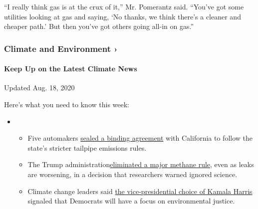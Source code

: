 ``I really think gas is at the crux of it,'' Mr. Pomerantz said.
``You've got some utilities looking at gas and saying, `No thanks, we
think there's a cleaner and cheaper path.' But then you've got others
going all-in on gas.''

\href{https://www.nytimes3xbfgragh.onion/section/climate?action=click\&pgtype=Article\&state=default\&region=MAIN_CONTENT_1\&context=storylines_keepup}{}

\hypertarget{climate-and-environment-}{%
\subsubsection{Climate and Environment
›}\label{climate-and-environment-}}

\hypertarget{keep-up-on-the-latest-climate-news}{%
\paragraph{Keep Up on the Latest Climate
News}\label{keep-up-on-the-latest-climate-news}}

Updated Aug. 18, 2020

Here's what you need to know this week:

\begin{itemize}
\item
  \begin{itemize}
  \tightlist
  \item
    Five automakers
    \href{https://www.nytimes3xbfgragh.onion/2020/08/17/climate/california-automakers-pollution.html?action=click\&pgtype=Article\&state=default\&region=MAIN_CONTENT_1\&context=storylines_keepup}{sealed
    a binding agreement} with California to follow the state's stricter
    tailpipe emissions rules.
  \item
    The Trump
    administration\href{https://www.nytimes3xbfgragh.onion/2020/08/13/climate/trump-methane.html?action=click\&pgtype=Article\&state=default\&region=MAIN_CONTENT_1\&context=storylines_keepup}{eliminated
    a major methane rule}, even as leaks are worsening, in a decision
    that researchers warned ignored science.
  \item
    Climate change leaders said
    \href{https://www.nytimes3xbfgragh.onion/2020/08/12/climate/kamala-harris-environmental-justice.html?action=click\&pgtype=Article\&state=default\&region=MAIN_CONTENT_1\&context=storylines_keepup}{the
    vice-presidential choice of Kamala Harris} signaled that Democrats
    will have a focus on environmental justice.
  \end{itemize}
\end{itemize}

